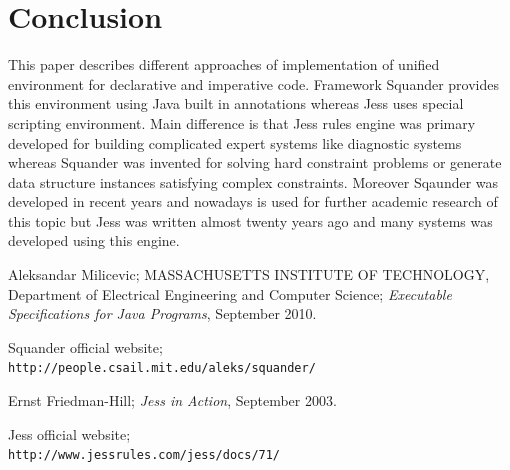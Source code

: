 \documentclass[conference]{IEEEtran}
\begin{document}


\section{Conclusion}
This paper describes different approaches of implementation of unified
environment for declarative and imperative code. Framework Squander provides
this environment using Java built in annotations whereas Jess uses special
scripting environment. Main difference is that Jess rules engine was primary
developed for building complicated expert systems\cite{hill:jessInAction} like diagnostic systems
whereas Squander was invented for solving hard constraint problems or generate
data structure instances satisfying complex constraints. Moreover Sqaunder was
developed in recent years and nowadays is used for further academic research of
this topic but Jess was written almost twenty years ago and many systems was
developed using this engine.


\begin{thebibliography}{1}

Aleksandar Milicevic; MASSACHUSETTS INSTITUTE OF TECHNOLOGY, Department of
Electrical Engineering and Computer Science; \textit{Executable Specifications
for Java Programs}, September 2010.



Squander
official website;\\\verb|http://people.csail.mit.edu/aleks/squander/|


Ernst Friedman-Hill; \textit{Jess in Action}, September 2003.



Jess official
website;\\\verb|http://www.jessrules.com/jess/docs/71/|




\end{thebibliography}




\end{document}
